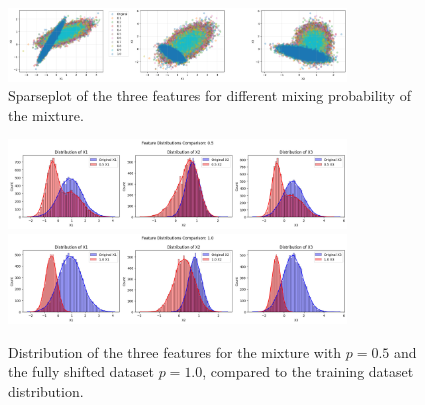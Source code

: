 \begin{figure}
    \centering
    \includegraphics[width=0.8\textwidth]{assets/sparse_mix_shift.png}
    \caption{Sparseplot of the three features for different mixing probability of the mixture.}
    \label{fig:sparse_mix_shift}
\end{figure}
\begin{figure}
    \centering
    \includegraphics[width=0.8\textwidth]{assets/dist_mix05.png}
    \includegraphics[width=0.8\textwidth]{assets/dist_fullshift.png}
    \caption{Distribution of the three features for the mixture with $p=0.5$ and the fully shifted dataset $p=1.0$, compared to the training dataset distribution.}
    \label{fig:dist_mix05}
\end{figure}
